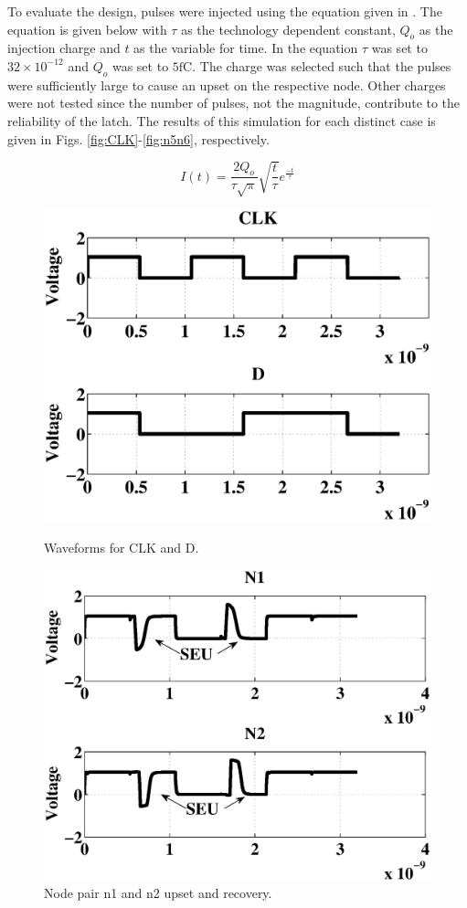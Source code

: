 To evaluate the design, pulses were injected using the equation given in \cite{injeq}. The equation is given below with $\tau$ as the technology dependent constant, $Q_o$ as the injection charge and $t$ as the variable for time. In the equation $\tau$ was set to $32\times10^{-12}$ and $Q_o$ was set to $5\text{fC}$. The charge was selected such that the pulses were sufficiently large to cause an upset on the respective node. Other charges were not tested since the number of pulses, not the magnitude, contribute to the reliability of the latch. The results of this simulation for each distinct case is given in Figs. \ref{fig:CLK}-\ref{fig:n5n6}, respectively. 

\begin{equation}\label{qeq}
	I(t)=\frac{2Q_o}{\tau\sqrt{\pi}}\sqrt{\frac{t}{\tau}}e^{\frac{-t}{\tau}}
\end{equation}

\begin{figure}[!htbp]
	\centering
	\parbox{4cm}{
		\includegraphics[trim = 0mm 15mm 0mm 13mm, clip, width=0.70\linewidth]{Figures/WavePlots/CLKD.eps}		\caption{Waveforms for CLK and D.}
		\label{fig:CLK}}
	\qquad
	\begin{minipage}{4cm}
		\includegraphics[width=\linewidth]{Figures/WavePlots/n1n2.eps}
		\caption{Node pair n1 and n2 upset and recovery.}
		\label{fig:n1n2}
	\end{minipage}
\end{figure}

